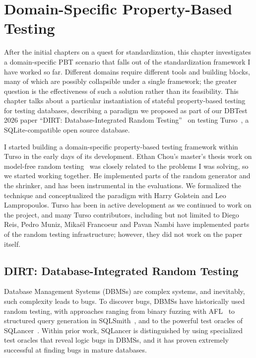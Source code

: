 
\renewcommand{\thechapter}{4}

\chapter{Domain-Specific Property-Based Testing}\label{chap:dirt}

After the initial chapters on a quest for standardization, this chapter investigates a
domain-specific PBT scenario that falls out of the standardization framework I have
worked so far. Different domains require different tools and building blocks, many of
which are possibly collapsible under a single framework; the greater question is the
effectiveness of such a solution rather than its feasibility. This chapter talks about
a particular instantiation of stateful property-based testing for testing databases,
describing a paradigm we proposed as part of our DBTest 2026 paper ``DIRT:
Database-Integrated Random Testing''~\cite{dirt-dbtest26} on testing
Turso~\cite{turso}, a SQLite-compatible open source database.

I started building a domain-specific property-based testing framework within Turso in
the early days of its development. Ethan Chou's master's thesis work on model-free
random testing~\cite{chou2025modelfree} was closely related to the problems I was
solving, so we started working together. He implemented parts of the random generator
and the shrinker, and has been instrumental in the evaluations. We formalized the
technique and conceptualized the paradigm with Harry Golstein and Leo Lampropoulos.
Turso has been in active development as we continued to work on the project, and many
Turso contributors, including but not limited to Diego Reis, Pedro Muniz, Mikaël
Francoeur and Pavan Nambi have implemented parts of the random testing infrastructure;
however, they did not work on the paper itself.

\section{DIRT: Database-Integrated Random Testing}\label{dirt:sec:intro}

Database Management Systems (DBMSs) are complex systems, and inevitably, such
complexity leads to bugs. To discover bugs, DBMSs have historically used random
testing, with approaches ranging from binary fuzzing with AFL~\cite{aflplusplus} to
structured query generation in SQLSmith~\cite{sqlsmith}, and to the powerful test
oracles of SQLancer~\cite{SQLancer}. Within prior work, SQLancer is distinguished by
using specialized test oracles that reveal logic bugs in DBMSs, and it has proven
extremely successful at finding bugs in mature databases.

